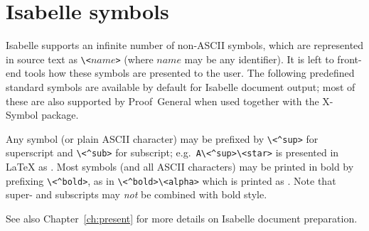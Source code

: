 

\chapter{Isabelle symbols}\label{app:symbols}

Isabelle supports an infinite number of non-ASCII symbols, which are
represented in source text as \verb,\<,$name$\verb,>, (where $name$ may be any
identifier).  It is left to front-end tools how these symbols are presented to
the user.  The following predefined standard symbols are available by default
for Isabelle document output; most of these are also supported by
Proof~General when used together with the X-Symbol package.

Any symbol (or plain ASCII character) may be prefixed by \verb,\<^sup>, for
superscript and \verb,\<^sub>, for subscript; e.g.\ \verb,A\<^sup>\<star>, is
presented in {\LaTeX} as .  Most symbols (and
all ASCII characters) may be printed in bold by prefixing \verb,\<^bold>,, as
in \verb,\<^bold>\<alpha>, which is printed as
\isa{\isactrlbold{\isasymalpha}}.  Note that super- and subscripts may
\emph{not} be combined with bold style.

See also Chapter~\ref{ch:present} for more details on Isabelle document
preparation.

\begin{center}
    
\end{center}

